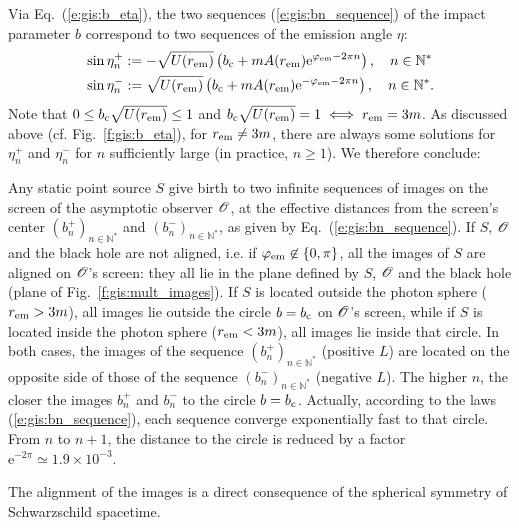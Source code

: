 Via Eq.~(\ref{e:gis:b_eta}), the two sequences (\ref{e:gis:bn_sequence}) of the impact parameter $b$
correspond to two sequences of the emission angle $\eta$:
\begin{subequations}
\begin{align}
&\sin\eta_n^+ := - \sqrt{U(r_{\rm em})}
\left( b_{\rm c} + m A(r_{\rm em})  \mathrm{e}^{\varphi_{\rm em} - 2\pi n} \right), \quad
n\in \mathbb{N}^* \\
&\sin\eta_n^- := \sqrt{U(r_{\rm em})}
\left( b_{\rm c} + m A(r_{\rm em})  \mathrm{e}^{-\varphi_{\rm em} - 2\pi n} \right),
\quad n\in \mathbb{N}^*.
\end{align}
\end{subequations}
Note that $0 \leq b_{\rm c} \sqrt{U(r_{\rm em})} \leq 1$ and
$b_{\rm c} \sqrt{U(r_{\rm em})} = 1 \iff r_{\rm em} = 3m$.
As discussed above (cf. Fig.~\ref{f:gis:b_eta}), for $r_{\rm em} \not= 3m$,
there are always some solutions for $\eta_n^+$ and $\eta_n^-$ for $n$
sufficiently large (in practice, $n\geq 1$). We therefore conclude:
\begin{greybox}
Any static point source $S$ give birth to two infinite sequences of images
on the screen of the asymptotic observer $\mathscr{O}$, at the effective distances
from the screen's center
$(b_n^+)_{n\in\mathbb{N}^*}$ and $(b_n^-)_{n\in\mathbb{N}^*}$, as
given by Eq.~(\ref{e:gis:bn_sequence}).
If $S$, $\mathscr{O}$ and the black hole are not aligned, i.e. if
$\varphi_{\rm em} \not\in\{0, \pi\}$,
all the images of $S$ are aligned on $\mathscr{O}$'s screen: they
all lie in the plane defined by $S$, $\mathscr{O}$ and the black hole (plane of
Fig.~\ref{f:gis:mult_images}). If $S$ is located outside the photon sphere
($r_{\rm em} > 3m$), all images lie outside the circle $b=b_{\rm c}$ on $\mathscr{O}$'s screen,
while if $S$ is located inside the photon sphere ($r_{\rm em} < 3m$),
all images lie inside that circle. In both cases,
the images of the sequence $(b_n^+)_{n\in\mathbb{N}^*}$ (positive $L$)
are located on the opposite side of those of the sequence
$(b_n^-)_{n\in\mathbb{N}^*}$ (negative $L$). The higher $n$, the closer
the images $b_n^+$ and $b_n^-$ to the circle $b=b_{\rm c}$. Actually,
according to the laws (\ref{e:gis:bn_sequence}),
each sequence converge exponentially fast to that circle. From $n$ to $n+1$,
the distance to the circle is reduced by a factor
$\mathrm{e}^{- 2\pi}\simeq 1.9\times 10^{-3}$.
\end{greybox}

\begin{remark}
The alignment of the images is a direct consequence of the spherical
symmetry of Schwarzschild spacetime.
\end{remark}

